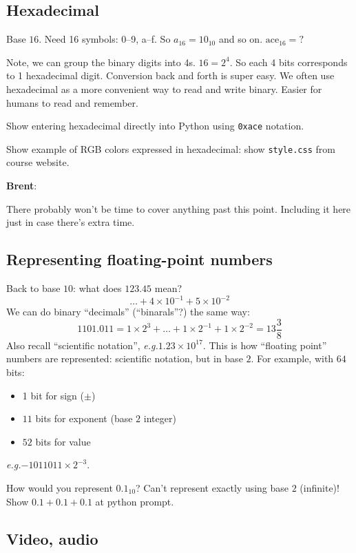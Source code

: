 \documentclass{article}
\newcommand{\eg}{\emph{e.g.}\xspace}
\newenvironment{reflect}[1]
{
  \noindent
  \begin{lrbox}{\reflectbox}
    \begin{minipage}[t]{\textwidth}
      \textbf{#1}:
}{
    \end{minipage}
  \end{lrbox}
  \fbox{\usebox{\reflectbox}}
}
\begin{document}
\subsection*{Hexadecimal}

Base $16$.  Need 16 symbols: 0--9, a--f. So $a_{16} = 10_{10}$ and so
on. $\mbox{ace}_{16} = ?$

Note, we can group the binary digits into 4s.  $16 = 2^4$.  So each 4
bits corresponds to 1 hexadecimal digit.  Conversion back and forth is
super easy.  We often use hexadecimal as a more convenient way to read
and write binary.  Easier for humans to read and remember.

Show entering hexadecimal directly into Python using \verb|0xace|
notation.

Show example of RGB colors expressed in hexadecimal: show
\verb|style.css| from course website.

\begin{reflect}{Brent}
  There probably won't be time to cover anything past this point.
  Including it here just in case there's extra time.
\end{reflect}

\subsection*{Representing floating-point numbers}

Back to base $10$: what does $123.45$ mean?
\[ \dots + 4 \times 10^{-1} + 5 \times 10^{-2} \]
We can do binary ``decimals'' (``binarals''?) the same way: \[
1101.011 = 1 \times 2^3 + \dots + 1 \times 2^{-1} + 1 \times 2^{-2} =
13 \frac{3}{8} \]  Also recall ``scientific notation'', \eg $1.23
\times 10^{17}$.  This is how ``floating point'' numbers are
represented: scientific notation, but in base $2$.  For example, with
$64$ bits:
\begin{itemize}
\item 1 bit for sign ($\pm$)
\item $11$ bits for exponent (base $2$ integer)
\item $52$ bits for value
\end{itemize}
\eg $-1011011 \times 2^{-3}$.

How would you represent $0.1_{10}$?  Can't represent exactly using
base $2$ (infinite)! Show $0.1 + 0.1 + 0.1$ at python prompt.

\subsection*{Video, audio}
\end{document}
